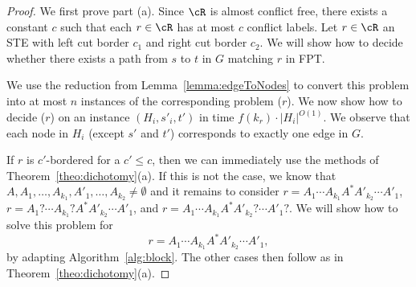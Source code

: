 \documentclass[a4paper,english]{lipics-v2016}
\theoremstyle{plain}
\begin{document}
\edgeDichotomyThm*
\begin{proof}
We first prove part (a). 
Since $\cR$ is almost conflict free, there exists a constant $c$ such that each $r \in \cR$ has at most $c$ conflict labels. Let $r \in \cR$ an STE with left cut border $c_1$ and right cut border $c_2$. We will show how to decide whether there exists a path from $s$ to $t$ in $G$ matching $r$ in FPT. 

We use the reduction from Lemma~\ref{lemma:edgeToNodes} to convert this problem into at most $n$ instances of the corresponding problem \nodesimpath($r$). We now show how to decide \nodesimpath($r$) on an instance $(H_i, s'_i, t')$ in time $f(k_r)\cdot |H_i|^{O(1)}$.
We observe that each node in $H_i$ (except $s'$ and $t'$) corresponds to exactly one edge in $G$.

If $r$ is $c'$-bordered for a $c' \leq c$, then we can immediately use the methods of Theorem~\ref{theo:dichotomy}(a). If this is not the case, we know that $A, A_1, \ldots, A_{k_1}, A'_1, \ldots, A_{k_2}\neq \emptyset$ and it remains to consider $r = A_1 \cdots A_{k_1} A^* A'_{k_2} \cdots A'_1$, $r = A_1? \cdots A_{k_1}? A^* A'_{k_2} \cdots A'_1$, and $r = A_1 \cdots A_{k_1} A^* A'_{k_2}? \cdots A'_1?$.
We will show how to solve this problem for $$r = A_1 \cdots A_{k_1} A^* A'_{k_2} \cdots A'_1,$$ by adapting Algorithm~\ref{alg:block}. The other cases then follow as in Theorem~\ref{theo:dichotomy}(a).


\end{proof}
\end{document}
